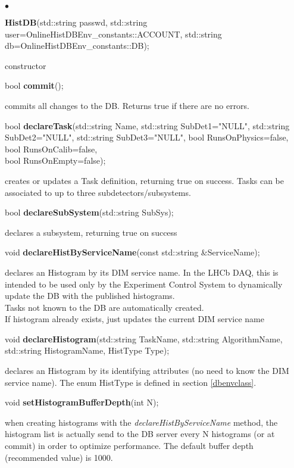 \documentclass{lhcbnote}
\begin{document}
\begin{list}{$\bullet$}{}
\item {\bf HistDB}(std::string passwd, 
		std::string user=OnlineHistDBEnv\_constants::ACCOUNT, 
		std::string db=OnlineHistDBEnv\_constants::DB);

constructor

\item bool {\bf commit}();

commits all changes to the DB. Returns true if there are no errors.


\item bool {\bf declareTask}(std::string Name, 
		   std::string SubDet1="NULL", 
		   std::string SubDet2="NULL", 
		   std::string SubDet3="NULL",
		   bool RunsOnPhysics=false, 
		   bool RunsOnCalib=false,\\ 
		   bool RunsOnEmpty=false);

creates or updates a Task definition, returning true on success. Tasks can be associated to up to
three subdetectors/subsystems. 


\item   bool {\bf declareSubSystem}(std::string SubSys);

declares a  subsystem, returning true on success

\item   void {\bf declareHistByServiceName}(const std::string \&ServiceName);

declares an Histogram by its DIM service name. In the LHCb
DAQ, this is intended to be used only by the Experiment Control
System to dynamically update the DB with the published histograms.\\
Tasks not known to the DB are automatically created.\\
If histogram already exists, just updates the current DIM service name 


\item void {\bf declareHistogram}(std::string TaskName, 
			std::string AlgorithmName, 
			std::string HistogramName, 
			HistType Type); 

declares an Histogram by its identifying attributes (no need to know
the DIM service name). The enum HistType is defined in section \ref{dbenvclass}.


\item void {\bf setHistogramBufferDepth}(int N);

when creating histograms with the {\it declareHistByServiceName}
method, the histogram list is actually send to the DB server every N
histograms (or at commit) in order to optimize performance. The
default buffer depth (recommended value) is 1000.  


\end{list}
\end{document}
